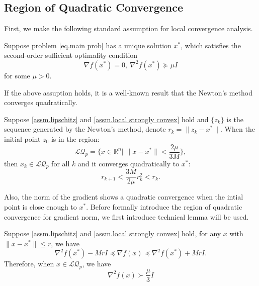\documentclass{article}
\begin{document}
\subsection{Region of Quadratic Convergence}
First, we make the following standard assumption for local convergence analysis.
\begin{assumption}
    \label{assm.local strongly convex}
    Suppose problem \eqref{eq.main prob} has a unique solution $x^*$, which satisfies the second-order sufficient optimality condition
    \begin{equation}
        \label{eq.second-order suff cond}
        \nabla f(x^*)=0, \ \nabla^2 f(x^*)\succeq \mu I  
    \end{equation}
    for some $\mu >0$.
\end{assumption}
If the above assuption holds, it is a well-known result that the Newton's method converges quadratically.
\begin{lemma}
\label{lem.quadratic point}
    Suppose \autoref{assm.lipschitz} and \autoref{assm.local strongly convex} hold and $\{z_k\}$ is the sequence generated by the Newton's method, denote $r_k = \|z_k-x^*\|$. When the initial point $z_0$ is in the region:
    \begin{equation}
        \label{eq.local quadratic region}
        \mathcal{LQ}_p = \{x\in\mathbb{R}^n| \ \|x-x^*\| < \frac{2\mu}{3M}\}, 
    \end{equation}
    then $x_k \in \mathcal{LQ}_p$ for all $k$ and it converges quadratically to $x^*$:
    \begin{equation}
        \label{eq.quadratic convergence}
        r_{k+1} < \frac{3M}{2\mu}r_k^2<r_k.
    \end{equation}
\end{lemma}
Also, the norm of the gradient shows a quadratic convergence when the intial point is close enough to $x^*$. Before formally introduce the region of quadratic convergence for gradient norm, we first introduce technical lemma will be used.
\begin{lemma}
    Suppose \autoref{assm.lipschitz} and \autoref{assm.local strongly convex} hold, for any $x$ with $\|x-x^*\| \leq r$, we have
    \begin{equation}
        \label{eq.psd region}
        \nabla^2 f(x^*)-MrI\preceq \nabla f(x) \preceq \nabla^2 f(x^*)+MrI.
    \end{equation}
    Therefore, when $x\in \mathcal{LQ}_p$, we have
    \begin{equation}
        \label{eq.psd xk}
        \nabla^2 f(x) \succ \frac{\mu}{3}I
    \end{equation}
\end{lemma}
\end{document}

